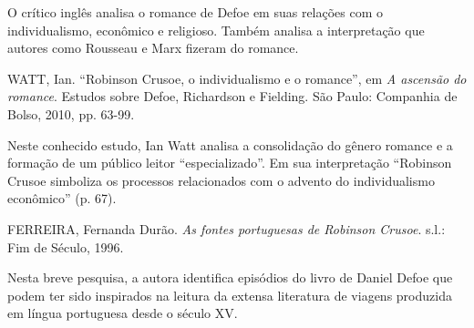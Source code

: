 \documentclass{article}
\begin{document}
O crítico inglês analisa o romance de Defoe em suas relações com o
individualismo, econômico e religioso. Também analisa a interpretação
que autores como Rousseau e Marx fizeram do romance.

WATT, Ian. ``Robinson Crusoe, o individualismo e o romance'', em \emph{A
ascensão do romance}. Estudos sobre Defoe, Richardson e Fielding. São
Paulo: Companhia de Bolso, 2010, pp. 63-99.

Neste conhecido estudo, Ian Watt analisa a consolidação do gênero
romance e a formação de um público leitor ``especializado''. Em sua
interpretação ``Robinson Crusoe simboliza os processos relacionados com
o advento do individualismo econômico'' (p. 67).

FERREIRA, Fernanda Durão. \emph{As fontes portuguesas de Robinson
Crusoe}. s.l.: Fim de Século, 1996.

Nesta breve pesquisa, a autora identifica episódios do livro de Daniel
Defoe que podem ter sido inspirados na leitura da extensa literatura de
viagens produzida em língua portuguesa desde o século XV.
\end{document}
